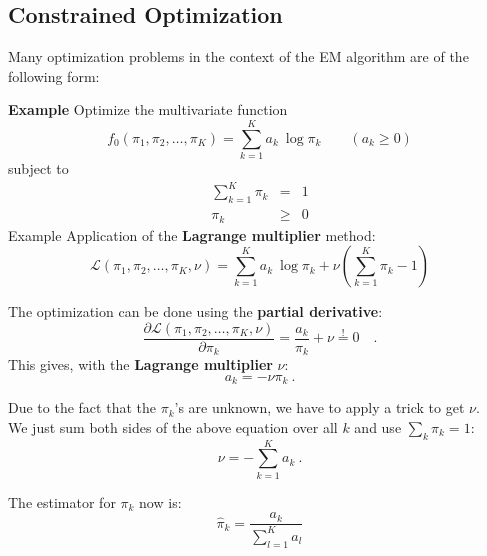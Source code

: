 \subsection{Constrained Optimization}

  Many optimization problems in the context of the EM algorithm are of the following form:   
 
   \textbf{Example}
    \small
    Optimize the multivariate function
    {\footnotesize
      \begin{displaymath}
        f_0(\pi_1,\pi_2,\dots,\pi_K) = \sum_{k=1}^{K} a_k \ \log \pi_k \qquad (a_k\ge0)
      \end{displaymath}
    }
    subject to
    {\footnotesize
      \begin{eqnarray*}
        \sum_{k=1}^K \pi_k & =    & 1 \\
        \pi_k              & \geq & 0
      \end{eqnarray*}
    }
  Example
    \small
    Application of the   \textbf{Lagrange multiplier} method:
    {\footnotesize
      \begin{displaymath}
        \mathcal L(\pi_1,\pi_2,\dots,\pi_K,\nu) = 
        \sum_{k=1}^K a_k\ \log \pi_k + \nu \left( \sum_{k=1}^K \pi_k-1 \right)  
      \end{displaymath}
    }
     
    The optimization can be done using the   \textbf{partial derivative}:
    {\footnotesize
      \begin{displaymath}
        \frac{\partial \mathcal L(\pi_1,\pi_2,\dots,\pi_K,\nu)}{\partial \pi_k} =
        \frac{a_k}{\pi_k} + \nu \stackrel{!}{=} 0 \quad .
      \end{displaymath}
    }
     \small
    This gives, with the \textbf{Lagrange multiplier} $\nu$:
    {\footnotesize
    \begin{displaymath}
      a_k= -\nu \pi_k~.  
    \end{displaymath}
    }

    Due to the fact that the $\pi_k$'s are unknown, we have to apply a trick to get $\nu$. \\
    We just sum both sides of the above equation over all $k$ and use $\sum_k\pi_k=1$:
    {\footnotesize
      \begin{displaymath}
        \nu = -\sum_{k=1}^K a_k~.  
      \end{displaymath}
    }

    The estimator for $\pi_k$ now is:
    {\footnotesize
      \begin{displaymath}
        \hat{\pi}_k = \frac{a_k}{\sum_{l=1}^K a_l}
      \end{displaymath}
    }
    
